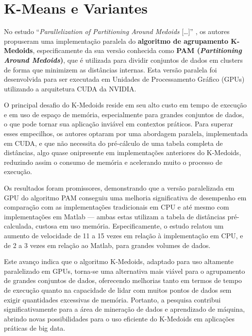 \documentclass[12pt,
openright, 
oneside, %
a4paper,    %
brazil]{facom-ufu-abntex2}
\begin{document}

\section{K-Means e Variantes}

No estudo \enquote{\textit{Parallelization of Partitioning Around Medoids} [\dots]} \cite{pamKMedoids2020}, os autores propuseram uma implementação paralela do \textbf{algoritmo de agrupamento K-Medoids}, especificamente da sua versão conhecida como \textbf{PAM (\textit{Partitioning Around Medoids})}, que é utilizada para dividir conjuntos de dados em clusters de forma que minimizem as distâncias internas. Esta versão paralela foi desenvolvida para ser executada em Unidades de Processamento Gráfico (GPUs) utilizando a arquitetura CUDA da NVIDIA.

O principal desafio do K-Medoids reside em seu alto custo em tempo de execução e em uso de espaço de memória, especialmente para grandes conjuntos de dados, o que pode tornar sua aplicação inviável em contextos práticos. Para superar esses empecilhos, os autores optaram por uma abordagem paralela, implementada em CUDA, e que não necessita do pré-cálculo de uma tabela completa de distâncias, algo quase onipresente em implementações anteriores do K-Medoids, reduzindo assim o consumo de memória e acelerando muito o processo de execução.

Os resultados foram promissores, demonstrando que a versão paralelizada em GPU do algoritmo PAM conseguiu uma melhoria significativa de desempenho em comparação com as implementações tradicionais em CPU e até mesmo com implementações em Matlab --- ambas estas utilizam a tabela de distâncias pré-calculada, custosa em uso memória. Especificamente, o estudo relatou um aumento de velocidade de 11 a 15 vezes em relação à implementação em CPU, e de 2 a 3 vezes em relação ao Matlab, para grandes volumes de dados.

Este avanço indica que o algoritmo K-Medoids, adaptado para uso altamente paralelizado em GPUs, torna-se uma alternativa mais viável para o agrupamento de grandes conjuntos de dados, oferecendo melhorias tanto em termos de tempo de execução quanto na capacidade de lidar com muitos pontos de dados sem exigir quantidades excessivas de memória. Portanto, a pesquisa contribui significativamente para a área de mineração de dados e aprendizado de máquina, abrindo novas possibilidades para o uso eficiente do K-Medoids em aplicações práticas de big data.
\end{document}

